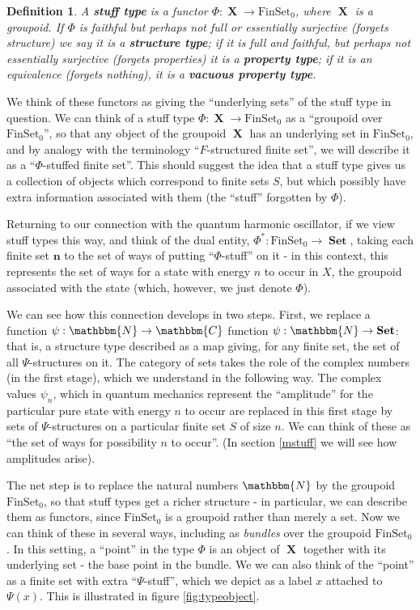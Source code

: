\documentclass{amsart} \usepackage{amsmath,amssymb,bbm}
\newcommand{\opname}[1]{\operatorname{#1}}
\newtheorem{definition}{Definition}
\newcommand{\bldsym}[1]{\boldsymbol{#1}}
\newcommand{\catname}[1]{\boldsymbol{\opname{{#1}}}}
\newcommand{\FSN}{\catname{FinSet_0}}
\newcommand{\Set}{\catname{Set}}
\begin{document}
\begin{definition}
  A {\textbf{stuff type}} is a functor $\Phi : \catname{X} \rightarrow
  \FSN$, where $\catname{X}$ is a groupoid.  If $\Phi$ is faithful
  but perhaps not full or essentially surjective (forgets structure) we say it
  is a {\textbf{structure type}}; if it is full and faithful, but perhaps
  not essentially surjective (forgets properties) it is a {\textbf{property
  type}}; if it is an equivalence (forgets nothing), it is a
  {\textbf{vacuous property type}}.
\end{definition}

We think of these functors as giving the ``underlying sets'' of the stuff type
in question.  We can think of a stuff type $\text{$\Phi : \catname{X} \rightarrow
\FSN$}$ as a ``groupoid over $\FSN$'', so that any object of the groupoid $\catname{X}$ 
has an underlying set in $\FSN$, and by analogy with the terminology
``$F$-structured finite set'', we will describe it as a
``$\Phi$-stuffed finite set''.  This should suggest the idea that a
stuff type gives us a collection of objects which correspond to finite
sets $S$, but which possibly have extra information associated with
them (the ``stuff'' forgotten by $\Phi$).

Returning to our connection with the quantum harmonic oscillator, if
we view stuff types this way, and think of the dual entity,
$\Phi^{\ast} : \FSN \rightarrow \Set$, taking each finite set
$\bldsym{n}$ to the set of ways of putting ``$\Phi$-stuff'' on it - in
this context, this represents the set of ways for a state with energy
$n$ to occur in $X$, the groupoid associated with the state (which,
however, we just denote $\Phi$).

We can see how this connection develops in two steps.  First, we
replace a function $\psi :\mathbbm{N} \rightarrow \mathbbm{C}$
function $\psi : \mathbbm{N} \rightarrow \Set$: that is, a structure
type described as a map giving, for any finite set, the set of all
$\Psi$-structures on it.  The category of sets takes the role of the
complex numbers (in the first stage), which we understand in the
following way.  The complex values $\psi_n$, which in quantum
mechanics represent the ``amplitude'' for the particular pure state
with energy $n$ to occur are replaced in this first stage by sets of
$\Psi$-structures on a particular finite set $S$ of size $n$.  We can
think of these as ``the set of ways for possibility $n$ to occur''.
(In section \ref{mstuff} we will see how amplitudes arise).

The net step is to replace the natural numbers $\mathbbm{N}$ by the
groupoid $\FSN$, so that stuff types get a richer structure - in
particular, we can describe them as functors, since $\FSN$ is a
groupoid rather than merely a set.  Now we can think of these in
several ways, including as {\textit{bundles}} over the groupoid
$\FSN$.  In this setting, a ``point'' in the type $\Phi$ is an object
of $\catname{X}$ together with its underlying set - the base point in
the bundle.  We we can also think of the ``point'' as a finite set
with extra ``$\Psi$-stuff'', which we depict as a label $x$ attached
to $\Psi(x)$.  This is illustrated in figure \ref{fig:typeobject}.
\end{document}
